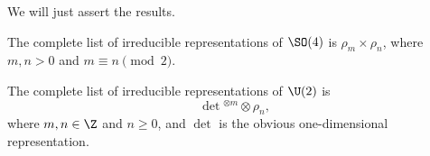 \documentclass[a4paper]{article}
\begin{document}
We will just assert the results.
\begin{prop}
  The complete list of irreducible representations of $\SO(4)$ is $\rho_m \times \rho_n$, where $m, n > 0$ and $m \equiv n \pmod 2$.
\end{prop}

\begin{prop}
  The complete list of irreducible representations of $\U(2)$ is
  \[
    \det{ }^{\otimes m} \otimes \rho_n,
  \]
  where $m, n \in \Z$ and $n \geq 0$, and $\det$ is the obvious one-dimensional representation.
\end{prop}

\printindex
\end{document}

